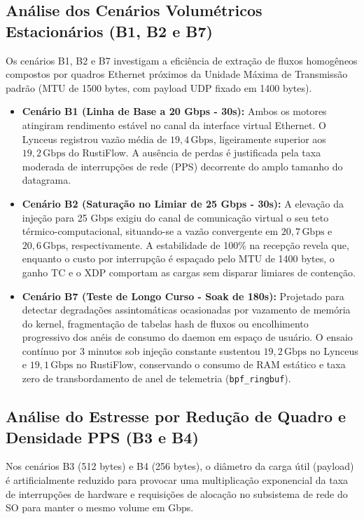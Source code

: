 \documentclass[11pt,a4paper]{article}
\begin{document}
\subsection{Análise dos Cenários Volumétricos Estacionários (B1, B2 e B7)}
Os cenários B1, B2 e B7 investigam a eficiência de extração de fluxos homogêneos compostos por quadros Ethernet próximos da Unidade Máxima de Transmissão padrão (MTU de 1500 bytes, com payload UDP fixado em 1400 bytes).

\begin{itemize}
    \item \textbf{Cenário B1 (Linha de Base a 20 Gbps - 30s):} Ambos os motores atingiram rendimento estável no canal da interface virtual Ethernet. O Lynceus registrou vazão média de $19,4\,\text{Gbps}$, ligeiramente superior aos $19,2\,\text{Gbps}$ do RustiFlow. A ausência de perdas é justificada pela taxa moderada de interrupções de rede (PPS) decorrente do amplo tamanho do datagrama.
    \item \textbf{Cenário B2 (Saturação no Limiar de 25 Gbps - 30s):} A elevação da injeção para 25 Gbps exigiu do canal de comunicação virtual o seu teto térmico-computacional, situando-se a vazão convergente em $20,7\,\text{Gbps}$ e $20,6\,\text{Gbps}$, respectivamente. A estabilidade de 100\% na recepção revela que, enquanto o custo por interrupção é espaçado pelo MTU de 1400 bytes, o ganho TC e o XDP comportam as cargas sem disparar limiares de contenção.
    \item \textbf{Cenário B7 (Teste de Longo Curso - Soak de 180s):} Projetado para detectar degradações assintomáticas ocasionadas por vazamento de memória do kernel, fragmentação de tabelas hash de fluxos ou encolhimento progressivo dos anéis de consumo do daemon em espaço de usuário. O ensaio contínuo por 3 minutos sob injeção constante sustentou $19,2\,\text{Gbps}$ no Lynceus e $19,1\,\text{Gbps}$ no RustiFlow, conservando o consumo de RAM estático e taxa zero de transbordamento de anel de telemetria (\texttt{bpf\_ringbuf}).
\end{itemize}

\subsection{Análise do Estresse por Redução de Quadro e Densidade PPS (B3 e B4)}
Nos cenários B3 (512 bytes) e B4 (256 bytes), o diâmetro da carga útil (payload) é artificialmente reduzido para provocar uma multiplicação exponencial da taxa de interrupções de hardware e requisições de alocação no subsistema de rede do SO para manter o mesmo volume em Gbps.
\end{document}
